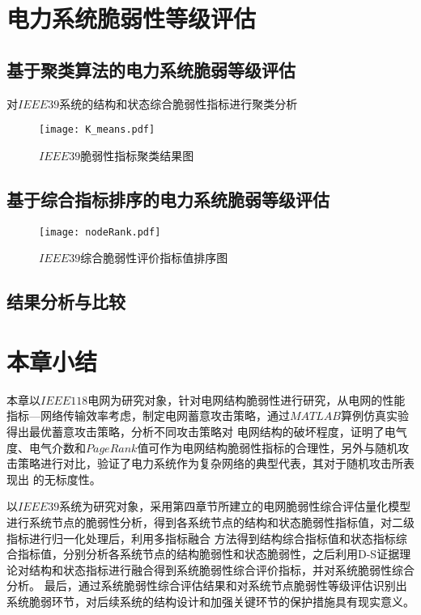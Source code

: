 \section{电力系统脆弱性等级评估}
\label{sec:multiAssessment}




\subsection{基于聚类算法的电力系统脆弱等级评估}
\label{sec:multiVSsingle}
对$IEEE39$系统的结构和状态综合脆弱性指标进行聚类分析
\begin{figure}[H] %
  \centering
  \texttt{[image: K\_means.pdf]}
  \caption{$IEEE39$脆弱性指标聚类结果图}
  \label{fig:K_means}
\end{figure}


\subsection{基于综合指标排序的电力系统脆弱等级评估}
\label{sec:multiAnalysis}
\begin{figure}[H] %
  \centering
  \texttt{[image: nodeRank.pdf]}
  \caption{$IEEE39$综合脆弱性评价指标值排序图}
  \label{fig:nodeRank}
\end{figure}




\subsection{结果分析与比较}




\section{本章小结}
\label{sec:sum5}
本章以$IEEE118$电网为研究对象，针对电网结构脆弱性进行研究，从电网的性能指标—网络传输效率考虑，制定电网蓄意攻击策略，通过$MATLAB$算例仿真实验得出最优蓄意攻击策略，分析不同攻击策略对
电网结构的破坏程度，证明了电气度、电气介数和$PageRank$值可作为电网结构脆弱性指标的合理性，另外与随机攻击策略进行对比，验证了电力系统作为复杂网络的典型代表，其对于随机攻击所表现出
的无标度性。

以$IEEE39$系统为研究对象，采用第四章节所建立的电网脆弱性综合评估量化模型进行系统节点的脆弱性分析，得到各系统节点的结构和状态脆弱性指标值，对二级指标进行归一化处理后，利用多指标融合
方法得到结构综合指标值和状态指标综合指标值，分别分析各系统节点的结构脆弱性和状态脆弱性，之后利用D-S证据理论对结构和状态指标进行融合得到系统脆弱性综合评价指标，并对系统脆弱性综合分析。
最后，通过系统脆弱性综合评估结果和对系统节点脆弱性等级评估识别出系统脆弱环节，对后续系统的结构设计和加强关键环节的保护措施具有现实意义。

